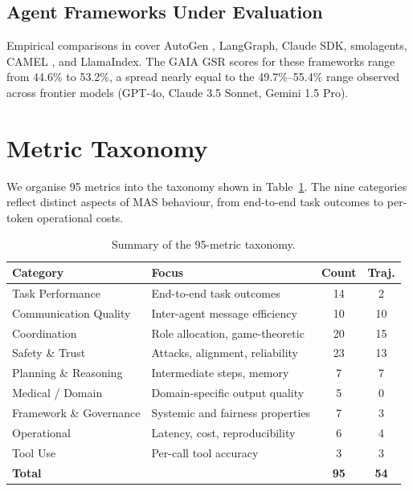 \documentclass[11pt,a4paper]{article}
\begin{document}
\subsection{Agent Frameworks Under Evaluation}

Empirical comparisons in \citet{maseval2025} cover AutoGen \citep{autogen2023},
LangGraph, Claude SDK, smolagents, CAMEL \citep{camel2023}, and LlamaIndex.
The GAIA GSR scores for these frameworks range from 44.6\% to 53.2\%, a spread nearly
equal to the 49.7\%--55.4\% range observed across frontier models
(GPT-4o, Claude 3.5 Sonnet, Gemini 1.5 Pro).

\section{Metric Taxonomy}
\label{sec:taxonomy}

We organise 95 metrics into the taxonomy shown in Table~\ref{tab:taxonomy_summary}.
The nine categories reflect distinct aspects of MAS behaviour, from end-to-end task
outcomes to per-token operational costs.

\begin{table}[h!]
  \centering
  \caption{Summary of the 95-metric taxonomy.}
  \label{tab:taxonomy_summary}
  \begin{tabular}{llcc}
    \toprule
    \textbf{Category} & \textbf{Focus} & \textbf{Count} & \textbf{Traj.} \\
    \midrule
    Task Performance         & End-to-end task outcomes            & 14 & 2  \\
    Communication Quality    & Inter-agent message efficiency       & 10 & 10 \\
    Coordination             & Role allocation, game-theoretic      & 20 & 15 \\
    Safety \& Trust          & Attacks, alignment, reliability      & 23 & 13 \\
    Planning \& Reasoning    & Intermediate steps, memory           &  7 &  7 \\
    Medical / Domain         & Domain-specific output quality       &  5 &  0 \\
    Framework \& Governance  & Systemic and fairness properties     &  7 &  3 \\
    Operational              & Latency, cost, reproducibility       &  6 &  4 \\
    Tool Use                 & Per-call tool accuracy               &  3 &  3 \\
    \midrule
    \textbf{Total}           &                                     & \textbf{95} & \textbf{54} \\
    \bottomrule
  \end{tabular}
\end{table}
\end{document}
